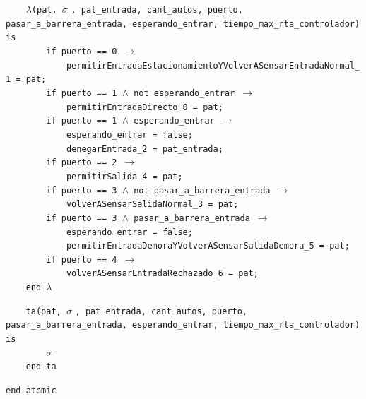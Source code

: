 \documentclass[12pt]{article}
\begin{document}
\begin{tcolorbox}[
    colback=black!5!white,
    colframe=black!80!white,
    boxrule=0.8pt,
    arc=2pt,
    left=5pt,
    right=5pt,
    top=5pt,
    bottom=5pt,
    fontupper=\ttfamily,
    breakable
]
\begin{flushleft}
\texttt{~~~~}$\lambda$\texttt{(pat, }$\sigma$ \texttt{, pat\_entrada, cant\_autos, puerto, pasar\_a\_barrera\_entrada, esperando\_entrar, tiempo\_max\_rta\_controlador) is} \\
\texttt{~~~~~~~~if puerto == 0 }\(\rightarrow\)\\
\texttt{~~~~~~~~~~~~permitirEntradaEstacionamientoYVolverASensarEntradaNormal\_1 = pat;}\\
\texttt{~~~~~~~~if puerto == 1 \(\land\) not esperando\_entrar }\(\rightarrow\)\\
\texttt{~~~~~~~~~~~~permitirEntradaDirecto\_0 = pat;}\\
\texttt{~~~~~~~~if puerto == 1 \(\land\) esperando\_entrar }\(\rightarrow\)\\
\texttt{~~~~~~~~~~~~esperando\_entrar = false;}\\
\texttt{~~~~~~~~~~~~denegarEntrada\_2 = pat\_entrada;}\\
\texttt{~~~~~~~~if puerto == 2 }\(\rightarrow\)\\
\texttt{~~~~~~~~~~~~permitirSalida\_4 = pat;}\\
\texttt{~~~~~~~~if puerto == 3 \(\land\) not pasar\_a\_barrera\_entrada }\(\rightarrow\)\\
\texttt{~~~~~~~~~~~~volverASensarSalidaNormal\_3 = pat;}\\
\texttt{~~~~~~~~if puerto == 3 \(\land\) pasar\_a\_barrera\_entrada }\(\rightarrow\)\\
\texttt{~~~~~~~~~~~~esperando\_entrar = false;}\\
\texttt{~~~~~~~~~~~~permitirEntradaDemoraYVolverASensarSalidaDemora\_5 = pat;}\\
\texttt{~~~~~~~~if puerto == 4 }\(\rightarrow\)\\
\texttt{~~~~~~~~~~~~volverASensarEntradaRechazado\_6 = pat;}\\
\texttt{~~~~end }$\lambda$
\end{flushleft}

\begin{flushleft}
\texttt{~~~~ta(pat, }$\sigma$ \texttt{, pat\_entrada, cant\_autos, puerto, pasar\_a\_barrera\_entrada, esperando\_entrar, tiempo\_max\_rta\_controlador) is} \\
\texttt{~~~~~~~~}$\sigma$ \\
\texttt{~~~~end ta}
\end{flushleft}

\begin{flushleft}
\texttt{end atomic}
\end{flushleft}
\end{tcolorbox}
\end{document}
